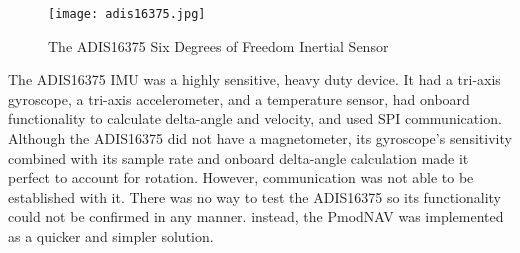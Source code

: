 \begin{figure}[H]
	\centerline{\texttt{[image: adis16375.jpg]}}
	\caption{The ADIS16375 Six Degrees of Freedom Inertial Sensor \cite{adisBreakout}}
	\label{adis16375}
\end{figure}

The ADIS16375 IMU was a highly sensitive, heavy duty device. It had a tri-axis gyroscope, a tri-axis accelerometer, and a temperature sensor, had onboard functionality to calculate delta-angle and velocity, and used SPI communication. Although the ADIS16375 did not have a magnetometer, its gyroscope's sensitivity combined with its sample rate and onboard delta-angle calculation made it perfect to account for rotation. However, communication was not able to be established with it. There was no way to test the ADIS16375 so its functionality could not be confirmed in any manner. instead, the PmodNAV was implemented as a quicker and simpler solution.




